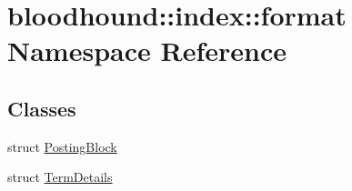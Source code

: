\hypertarget{namespacebloodhound_1_1index_1_1format}{}\section{bloodhound\+:\+:index\+:\+:format Namespace Reference}
\label{namespacebloodhound_1_1index_1_1format}
\subsection*{Classes}
\begin{DoxyCompactItemize}
\item 
struct \hyperlink{structbloodhound_1_1index_1_1format_1_1PostingBlock}{Posting\+Block}
\item 
struct \hyperlink{structbloodhound_1_1index_1_1format_1_1TermDetails}{Term\+Details}
\end{DoxyCompactItemize}
